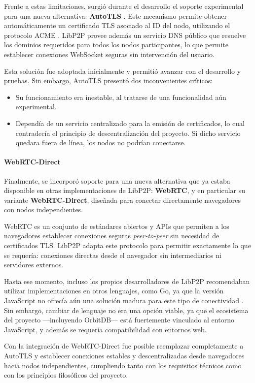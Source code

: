 Frente a estas limitaciones, surgió durante el desarrollo el soporte experimental para una nueva alternativa: \textbf{AutoTLS} \cite{autotls}. Este mecanismo permite obtener automáticamente un certificado TLS asociado al ID del nodo, utilizando el protocolo ACME \cite{acme}. LibP2P provee además un servicio DNS público que resuelve los dominios requeridos para todos los nodos participantes, lo que permite establecer conexiones WebSocket seguras sin intervención del usuario.

Esta solución fue adoptada inicialmente y permitió avanzar con el desarrollo y pruebas. Sin embargo, AutoTLS presentó dos inconvenientes críticos:
\begin{itemize}
  \item Su funcionamiento era inestable, al tratarse de una funcionalidad aún experimental.
  \item Dependía de un servicio centralizado para la emisión de certificados, lo cual contradecía el principio de descentralización del proyecto. Si dicho servicio quedara fuera de línea, los nodos no podrían conectarse.
\end{itemize}

\paragraph{WebRTC-Direct}

Finalmente, se incorporó soporte para una nueva alternativa que ya estaba disponible en otras implementaciones de LibP2P: \textbf{WebRTC}, y en particular su variante \textbf{WebRTC-Direct}, diseñada para conectar directamente navegadores con nodos independientes.

WebRTC es un conjunto de estándares abiertos y APIs que permiten a los navegadores establecer conexiones seguras \textit{peer-to-peer} sin necesidad de certificados TLS. LibP2P adapta este protocolo para permitir exactamente lo que se requería: conexiones directas desde el navegador sin intermediarios ni servidores externos.

Hasta ese momento, incluso los propios desarrolladores de LibP2P recomendaban utilizar implementaciones en otros lenguajes, como Go, ya que la versión JavaScript no ofrecía aún una solución madura para este tipo de conectividad \cite{differences-nodejs-browser}. Sin embargo, cambiar de lenguaje no era una opción viable, ya que el ecosistema del proyecto —incluyendo OrbitDB— está fuertemente vinculado al entorno JavaScript, y además se requería compatibilidad con entornos web.

Con la integración de WebRTC-Direct fue posible reemplazar completamente a AutoTLS y establecer conexiones estables y descentralizadas desde navegadores hacia nodos independientes, cumpliendo tanto con los requisitos técnicos como con los principios filosóficos del proyecto.
